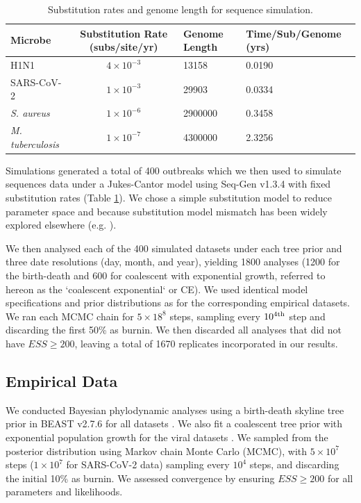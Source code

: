 \documentclass[12pt]{article}
\begin{document}
\begin{spacing}{2}
\begin{table}[H]
    \centering
    \caption{Substitution rates and genome length for sequence simulation.}
    \begin{tabular}{|l|c|l|l|}
    \hline
    Microbe                     &   Substitution Rate (subs/site/yr) & Genome Length & Time/Sub/Genome (yrs)  \\
    \hline
    H1N1                        & $4\times10^{-3}$ & 13158 & 0.0190\\
    SARS-CoV-2                  & $1\times10^{-3}$ & 29903 & 0.0334\\
    \textit{S. aureus}    & $1\times10^{-6}$ & 2900000  & 0.3458\\
    \textit{M. tuberculosis}    &   $1\times10^{-7}$ & 4300000 & 2.3256\\
    \hline
    \end{tabular}
    \label{tab:seq_parms}
\end{table}

Simulations generated a total of 400 outbreaks which we then used to simulate sequences data under a Jukes-Cantor model using Seq-Gen v1.3.4 \citep{rambaut_seq-gen_1997} with fixed substitution rates (Table \ref{tab:seq_parms}). We chose a simple substitution model to reduce parameter space and because substitution model mismatch has been widely explored elsewhere (e.g. \citet{lemmon2004importance}).

We then analysed each of the 400 simulated datasets under each tree prior and three date resolutions (day, month, and year), yielding 1800 analyses (1200 for the birth-death and 600 for coalescent with exponential growth, referred to hereon as the `coalescent exponential` or CE). We used identical model specifications and prior distributions as for the corresponding empirical datasets. We ran each MCMC chain for $5\times18^{8}$ steps, sampling every $10^{4\textnormal{th}}$ step and discarding the first 50\% as burnin. We then discarded all analyses that did not have $ESS\geq200$, leaving a total of 1670 replicates incorporated in our results.

\subsection*{Empirical Data}
We conducted Bayesian phylodynamic analyses using a birth-death skyline tree prior in BEAST v2.7.6 for all datasets \citep{bouckaert_beast_2019,stadler2012estimating}. We also fit a coalescent tree prior with exponential population growth for the viral datasets \citep{kingman_1982_coalescent}. We sampled from the posterior distribution using Markov chain Monte Carlo (MCMC), with $5\times10^{7}$ steps ($1\times10^{7}$ for SARS-CoV-2 data) sampling every $10^{4}$ steps, and discarding the initial 10\% as burnin. We assessed convergence by ensuring $ESS\geq200$ for all parameters and likelihoods.


\end{spacing}
\end{document}
